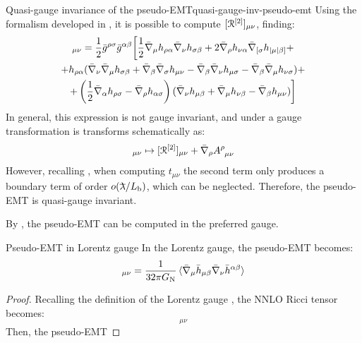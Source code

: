 \begin{observation}{Quasi-gauge invariance of the pseudo-EMT}{quasi-gauge-inv-pseudo-emt}
  Using the formalism developed in , it is possible to compute $ [\EuScript{R}^{[2]}]_{\mu \nu} $, finding:
  \begin{multline}
    [\rr\od2]_{\mu \nu} = \frac{1}{2} \bar{g}^{\rho \sigma} \bar{g}^{\alpha \beta} \bigg[ \frac{1}{2} \bar{\na}_\mu h_{\rho \alpha} \bar{\na}_\nu h_{\sigma \beta} + 2 \bar{\na}_\rho h_{\nu \alpha} \bar{\na}_{[\sigma} h_{|\mu| \beta]} + \\
    + h_{\rho \alpha} (\bar{\na}_\nu \bar{\na}_\mu h_{\sigma \beta} + \bar{\na}_\beta \bar{\na}_\sigma h_{\mu \nu} - \bar{\na}_\beta \bar{\na}_\nu h_{\mu \sigma} - \bar{\na}_\beta \bar{\na}_\mu h_{\nu \sigma}) + \\
    + \left( \frac{1}{2} \bar{\na}_\alpha h_{\rho \sigma} - \bar{\na}_\rho h_{\alpha \sigma} \right) ({\bar{\na}_\nu h_{\mu \beta} + \bar{\na}_\mu h_{\nu \beta} - \bar{\na}_\beta h_{\mu \nu}}) \bigg]
    \label{eq:nnlo-ricci}
  \end{multline}
  In general, this expression is not gauge invariant, and under a gauge transformation is transforms schematically as:
  \begin{equation}
    [\rr\od2]_{\mu \nu} \mapsto [\rr\od2]_{\mu \nu} + \bar{\na}_\rho \tensor{A}{^\rho_{\mu \nu}}
  \end{equation}
  However, recalling , when computing $ t_{\mu \nu} $ the second term only produces a boundary term of order $ \smo(\lbar / L_\text{b}) $, which can be neglected. Therefore, the pseudo-EMT is quasi-gauge invariant.
\end{observation}

By , the pseudo-EMT can be computed in the preferred gauge.

\begin{lemma}{Pseudo-EMT in Lorentz gauge}{}
  In the Lorentz gauge, the pseudo-EMT becomes:
  \begin{equation}
    [t\od2]_{\mu \nu} = \frac{1}{32\pi \gn} \braket{\bar{\na}_\mu \bar{h}_{\mu \beta} \bar{\na}_\nu \bar{h}^{\alpha \beta}}
  \end{equation}
\end{lemma}

\begin{proofbox}
  \begin{proof}
    Recalling the definition of the Lorentz gauge , the NNLO Ricci tensor  becomes:
    \begin{equation*}
      [\rr\od2]_{\mu \nu}
    \end{equation*}
    Then, the pseudo-EMT 
  \end{proof}
\end{proofbox}

